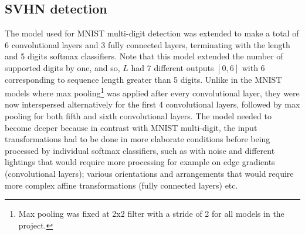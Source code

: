 \documentclass{article}
\begin{document}
	\subsection{SVHN detection}\label{svhn_detection}
	The model used for MNIST multi-digit detection was extended to make a total of 6 convolutional layers and 3 fully connected layers, terminating with the length and 5 digits softmax classifiers. Note that this model extended the number of supported digits by one, and so, $L$ had 7 different outputs $[0,6]$ with 6 corresponding to sequence length greater than 5 digits. Unlike in the MNIST models where max pooling\footnote{Max pooling was fixed at 2x2 filter with a stride of 2 for all models in the project.} was applied after every convolutional layer, they were now interspersed alternatively for the first 4 convolutional layers, followed by max pooling for both fifth and sixth convolutional layers. The model needed to become deeper because in contrast with MNIST multi-digit, the input transformations had to be done in more elaborate conditions before being processed by individual softmax classifiers, such as with noise and different lightings that would require more processing for example on edge gradients (convolutional layers); various orientations and arrangements that would require more complex affine transformations (fully connected layers) etc.
	
\end{document}
